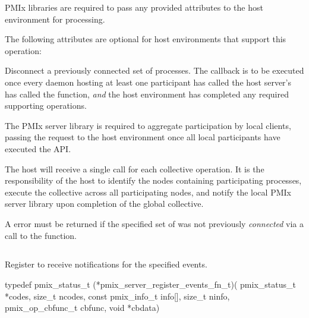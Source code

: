 \reqattrstart
\ac{PMIx} libraries are required to pass any provided attributes to the host environment for processing.
\reqattrend

\optattrstart
The following attributes are optional for host environments that support this operation:


\optattrend

\descr

Disconnect a previously connected set of processes. The callback is to be executed once every daemon hosting at least one participant has called the host server's has called the  function, \textit{and} the host environment has completed any required supporting operations.

\adviceimplstart
The \ac{PMIx} server library is required to aggregate participation by local clients, passing the request to the host environment once all local participants have executed the \ac{API}.
\adviceimplend

\advicermstart
The host will receive a single call for each collective operation. It is the responsibility of the host to identify the nodes containing participating processes, execute the collective across all participating nodes, and notify the local \ac{PMIx} server library upon completion of the global collective.

A  error must be returned if the specified set of  was not previously \textit{connected} via a call to the  function.
\advicermend


\subsection{}

\summary

Register to receive notifications for the specified events.

\format

\cspecificstart
\begin{codepar}
 typedef pmix_status_t (*pmix_server_register_events_fn_t)(
                              pmix_status_t *codes,
                              size_t ncodes,
                              const pmix_info_t info[],
                              size_t ninfo,
                              pmix_op_cbfunc_t cbfunc,
                              void *cbdata)
\end{codepar}
\cspecificend

